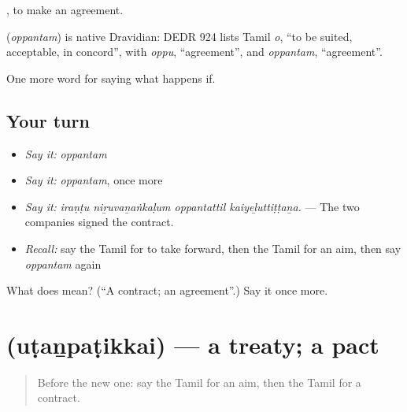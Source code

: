  , to make an agreement.

\begin{cousinweb}
\textbf{} (\emph{oppantam}) is native Dravidian: DEDR 924 lists Tamil \emph{o}, \textquotedblleft{}to be suited, acceptable, in concord\textquotedblright{}, with \emph{oppu}, \textquotedblleft{}agreement\textquotedblright{}, and \emph{oppantam}, \textquotedblleft{}agreement\textquotedblright{}.
\end{cousinweb}

\begin{grammarlens}[title={What you've built}]
One more word for saying what happens if.
\end{grammarlens}

\subsection*{Your turn}
\begin{itemize}
\raggedright
  \item \emph{Say it:} \emph{oppantam}
  \item \emph{Say it:} \emph{oppantam}, once more
  \item \emph{Say it:} \emph{iraṇṭu niṟuvaṉaṅkaḷum oppantattil kaiyeḻuttiṭṭaṉa.} — The two companies signed the contract.
  \item \emph{Recall:} say the Tamil for to take forward, then the Tamil for an aim, then say \emph{oppantam} again
\end{itemize}

\begin{tcolorbox}[breakable,colback=teal!4,colframe=teal!35!black,title={Before you move on}]
What does  mean? (\textquotedblleft{}A contract; an agreement\textquotedblright{}.) Say it once more.
\end{tcolorbox}
\section[\texorpdfstring{\ta{உடன்படிக்கை} (uṭaṉpaṭikkai)}{உடன்படிக்கை (uṭaṉpaṭikkai)}]{ (uṭaṉpaṭikkai) — a treaty; a pact}

\label{lesson:TA-C387-utanpatikkai}



\begin{quote}
Before the new one: say the Tamil for an aim, then the Tamil for a contract.
\end{quote}

